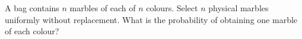 A bag contains $n$ marbles of each of $n$ colours. Select $n$ physical marbles uniformly without replacement. What is the probability of obtaining one marble of each colour?
